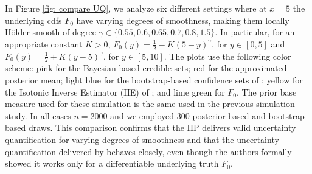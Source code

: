 In Figure \ref{fig: compare UQ}, we analyze six different settings where at $x=5$ the underlying cdfs $F_0$ have varying degrees of smoothness, making them locally H\"{o}lder smooth of degree $\gamma \in \{ 0.55, 0.6, 0.65, 0.7, 0.8, 1.5 \}$. In particular, for an appropriate constant $K>0$, $F_0(y) = \frac{1}{2} - K (5-y)^\gamma$, for $y \in [0,5]$ and $F_0(y) = \frac{1}{2} + K (y-5)^\gamma$, for $y \in [5,10]$. The plots use the following color scheme: pink for the Bayesian-based credible sets; red for the approximated posterior mean; light blue for the bootstrap-based confidence sets of \cite{19}; yellow for the Isotonic Inverse Estimator (IIE) of \cite{27}; and lime green for \( F_0 \). The prior base measure used for these simulation is the same used in the previous simulation study. In all cases \( n = 2000 \) and we employed 300 posterior-based and bootstrap-based draws. This comparison confirms that the IIP delivers valid uncertainty quantification for varying degrees of smoothness and that the uncertainty quantification delivered by \cite{19} behaves closely, even though the authors formally showed it works only for a differentiable underlying truth $F_0$.

